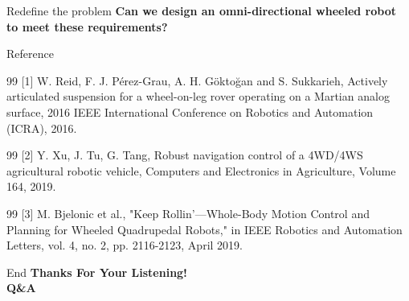 \begin{frame}{Redefine the problem} 
    \centering
    \textbf{Can we design an omni-directional wheeled robot \\
    to meet these requirements?}
\end{frame}

    

\begin{frame}{Reference} 
\footnotesize{
\begin{thebibliography}{99}
[1] W. Reid, F. J. Pérez-Grau, A. H. Göktoğan and S. Sukkarieh, Actively articulated suspension for a wheel-on-leg rover operating on a Martian analog surface, 2016 IEEE International Conference on Robotics and Automation (ICRA), 2016.
\end{thebibliography}

\begin{thebibliography}{99}
[2] Y. Xu, J. Tu, G. Tang, Robust navigation control of a 4WD/4WS agricultural robotic vehicle, Computers and Electronics in Agriculture, Volume 164, 2019.
\end{thebibliography}

\begin{thebibliography}{99}
[3] M. Bjelonic et al., "Keep Rollin’—Whole-Body Motion Control and Planning for Wheeled Quadrupedal Robots," in IEEE Robotics and Automation Letters, vol. 4, no. 2, pp. 2116-2123, April 2019.
\end{thebibliography}
}

\end{frame}

\begin{frame}{End} 
    \centering
    \textbf{Thanks For Your Listening! \\ Q\&A}
\end{frame}




    
